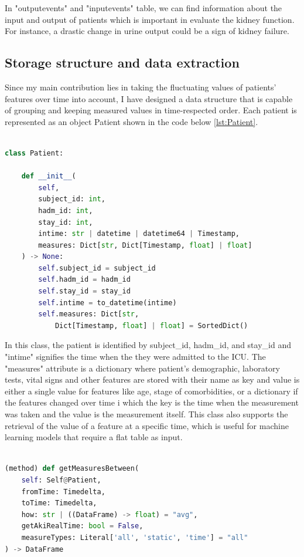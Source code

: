 \documentclass[../main.tex]{subfiles}
\begin{document}
In "outputevents" and "inputevents" table, we can find information about the input and output of patients which is important in evaluate the kidney function.
For instance, a drastic change in urine output could be a sign of kidney failure.


\subsection{Storage structure and data extraction}

Since my main contribution lies in taking the fluctuating values of patients' features over time into account, I have designed a data structure that is capable of grouping and keeping measured values in time-respected order.
Each patient is represented as an object Patient shown in the code below \ref{lst:Patient}.

\begin{lstlisting}[language=Python, caption={class Patient}, label={lst:Patient}]
    
class Patient:
    
    def __init__(
        self,
        subject_id: int,
        hadm_id: int,
        stay_id: int,
        intime: str | datetime | datetime64 | Timestamp,
        measures: Dict[str, Dict[Timestamp, float] | float]
    ) -> None:
        self.subject_id = subject_id
        self.hadm_id = hadm_id
        self.stay_id = stay_id
        self.intime = to_datetime(intime)
        self.measures: Dict[str, 
            Dict[Timestamp, float] | float] = SortedDict()

\end{lstlisting}

In this class, the patient is identified by subject\_id, hadm\_id, and stay\_id and "intime" signifies the time when the they were admitted to the ICU.
The "measures" attribute is a dictionary where patient's demographic, laboratory tests, vital signs and other features are stored with their name as key and value is either a single value for features like age, stage of comorbidities, or a dictionary if the features changed over time i which the key is the time when the measurement was taken and the value is the measurement itself.
This class also supports the retrieval of the value of a feature at a specific time, which is useful for machine learning models that require a flat table as input.

\begin{lstlisting}[language=Python, caption={getMeasuresBetween method}, label={lst:getMeasuresBetween}]

(method) def getMeasuresBetween(
    self: Self@Patient,
    fromTime: Timedelta,
    toTime: Timedelta,
    how: str | ((DataFrame) -> float) = "avg",
    getAkiRealTime: bool = False,
    measureTypes: Literal['all', 'static', 'time'] = "all"
) -> DataFrame

\end{lstlisting}
\end{document}
